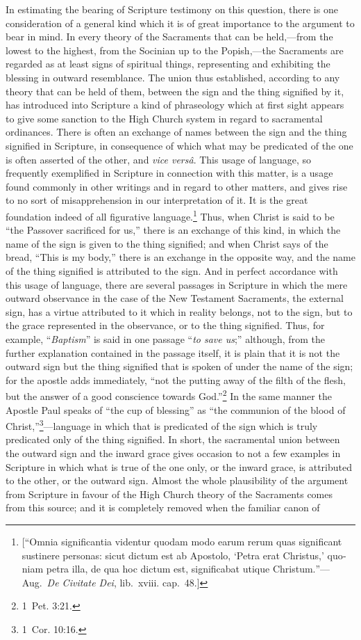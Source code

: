 \documentclass[
  english,
]{book}
\providecommand{\textlatin}{}
\renewcommand{\textlatin}[2][]{\foreignlanguage{latin}{#2}}
\begin{document}
In estimating the bearing of Scripture testimony on this question, there is one consideration of a general kind which it is of great importance to the argument to bear in mind. In every theory of the Sacraments that can be held,---from the lowest to the highest, from the Socinian up to the Popish,---the Sacraments are regarded as at least signs of spiritual things, representing and exhibiting the blessing in outward resemblance. The union thus established, according to any theory that can be held of them, between the sign and the thing signified by it, has introduced into Scripture a kind of phraseology which at first sight appears to give some sanction to the High Church system in regard to sacramental ordinances. There is often an exchange of names between the sign and the thing signified in Scripture, in consequence of which what may be predicated of the one is often asserted of the other, and \textlatin{\emph{vice versâ}}. This usage of language, so frequently exemplified in Scripture in connection with this matter, is a usage found commonly in other writings and in regard to other matters, and gives rise to no sort of misapprehension in our interpretation of it. It is the great foundation indeed of all figurative language.\footnote{{[}``\textlatin{Omnia significantia videntur quodam modo earum rerum quas significant sustinere personas: sicut dictum est ab Apostolo, `Petra erat Christus,' quoniam petra illa, de qua hoc dictum est, significabat utique Christum.}''---Aug.~\textlatin{\emph{De Civitate Dei}}, lib.~xviii. cap.~48.{]}} Thus, when Christ is said to be ``the Passover sacrificed for us,'' there is an exchange of this kind, in which the name of the sign is given to the thing signified; and when Christ says of the bread, ``This is my body,'' there is an exchange in the opposite way, and the name of the thing signified is attributed to the sign. And in perfect accordance with this usage of language, there are several passages in Scripture in which the mere outward observance in the case of the New Testament Sacraments, the external sign, has a virtue attributed to it which in reality belongs, not to the sign, but to the grace represented in the observance, or to the thing signified. Thus, for example, ``\emph{Baptism}'' is said in one passage ``\emph{to save us};'' although, from the further explanation contained in the passage itself, it is plain that it is not the outward sign but the thing signified that is spoken of under the name of the sign; for the apostle adds immediately, ``not the putting away of the filth of the flesh, but the answer of a good conscience towards God.''\footnote{1~Pet. 3:21.} In the same manner the Apostle Paul speaks of ``the cup of blessing'' as ``the communion of the blood of Christ,''\footnote{1~Cor. 10:16.}---language in which that is predicated of the sign which is truly predicated only of the thing signified. In short, the sacramental union between the outward sign and the inward grace gives occasion to not a few examples in Scripture in which what is true of the one only, or the inward grace, is attributed to the other, or the outward sign. Almost the whole plausibility of the argument from Scripture in favour of the High Church theory of the Sacraments comes from this source; and it is completely removed when the familiar canon of 
\end{document}
